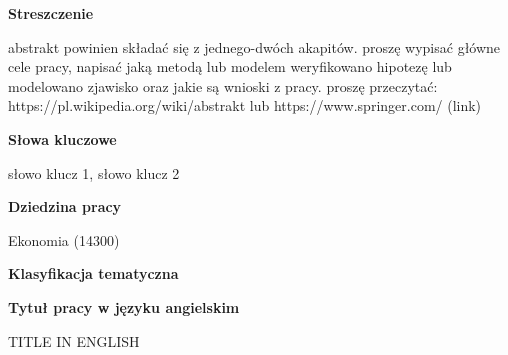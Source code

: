 \vspace*{6\baselineskip}
\begin{center}
\textbf{Streszczenie}
\end{center}
abstrakt powinien składać się z jednego-dwóch akapitów. proszę wypisać główne cele pracy, napisać jaką metodą lub modelem weryfikowano hipotezę lub modelowano zjawisko oraz jakie są wnioski z pracy. proszę przeczytać: https://pl.wikipedia.org/wiki/abstrakt lub https://www.springer.com/ (link)
\vspace{4\baselineskip}
\begin{center}
\textbf{Słowa kluczowe}
\end{center}
\begin{center}
słowo klucz 1, słowo klucz 2 
\end{center}
\vspace{3\baselineskip}
\begin{center}
\textbf{Dziedzina pracy}
\end{center}
\begin{center}
Ekonomia (14300)
\end{center}
\vspace{3\baselineskip}
\begin{center}
\textbf{Klasyfikacja tematyczna}
\end{center}
\vspace{4\baselineskip}
\begin{center}
\textbf{Tytuł pracy w języku angielskim}
\end{center}
\begin{center}
TITLE IN ENGLISH
\end{center}

\newpage
